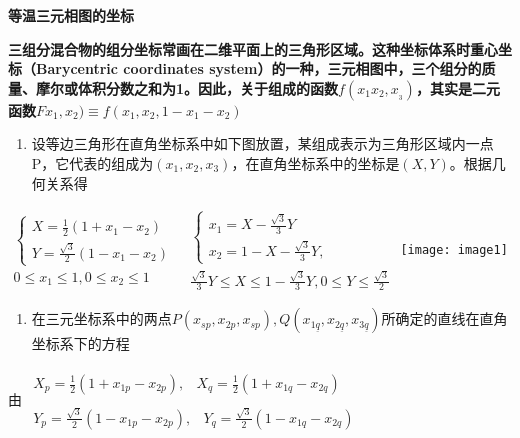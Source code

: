 \documentclass{article} %
\begin{document}


\noindent \textbf{$ $等温三元相图的坐标}


{\bf  三组分混合物的组分坐标常画在二维平面上的三角形区域。这种坐标体系时重心坐标（Barycentric coordinates system）的一种，三元相图中，三个组分的质量、摩尔或体积分数之和为1。因此，关于组成的函数$f\left(x_{1} x_{2} ,x_{{}_{3} } \right)$，其实是二元函数$Fx_{1} ,x_{2} )\equiv f(x_{1} ,x_{2} ,1-x_{1} -x_{2} )$}

\begin{enumerate}
\item  设等边三角形在直角坐标系中如下图放置，某组成表示为三角形区域内一点P，它代表的组成为$\left(x_{1} ,x_{2} ,x_{3} \right)$，在直角坐标系中的坐标是$\left(X,Y\right)$。根据几何关系得 
\end{enumerate}

\noindent $\begin{array}{l} {\left\{\begin{array}{c} {X=\frac{1}{2} (1+x_{1} -x_{2} )} \\ {Y=\frac{\sqrt{3} }{2} (1-x_{1} -x_{2} )} \end{array}\right. } \\ {0\le x_{1} \le 1,0\le x_{2} \le 1} \end{array}$   $\begin{array}{l} {\left\{\begin{array}{c} {x_{1} =X-\frac{\sqrt{3} }{3} Y} \\ {x_{2} =1-X-\frac{\sqrt{3} }{3} Y,} \end{array}\right. } \\ {\frac{\sqrt{3} }{3} Y\le X\le 1-\frac{\sqrt{3} }{3} Y,0\le Y\le \frac{\sqrt{3} }{2} } \end{array}$    \texttt{[image: image1]} $ $

\begin{enumerate}
\item  在三元坐标系中的两点$P\left(x_{sp} ,x_{2p} ,x_{sp} \right),Q\left(x_{1\underline{q}} ,x_{2\underline{q}} ,x_{3\underline{q}} \right)$所确定的直线在直角坐标系下的方程
\end{enumerate}

\noindent 由$\begin{array}{l} {\begin{array}{cc} {X_{p} =\frac{1}{2} \left(1+x_{1p} -x_{2p} \right),} & {X_{q} =\frac{1}{2} \left(1+x_{1q} -x_{2q} \right)} \end{array}} \\ {\begin{array}{cc} {Y_{p} =\frac{\sqrt{3} }{2} \left(1-x_{1p} -x_{2p} \right),} & {Y_{q} =\frac{\sqrt{3} }{2} \left(1-x_{1q} -x_{2q} \right)} \end{array}} \end{array}$
\end{document}
